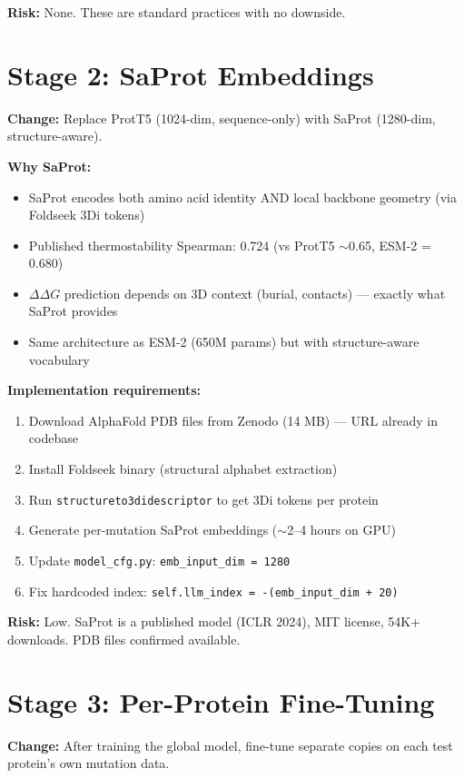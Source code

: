 \textbf{Risk:} None. These are standard practices with no downside.

\section{Stage 2: SaProt Embeddings}

\textbf{Change:} Replace ProtT5 (1024-dim, sequence-only) with SaProt (1280-dim, structure-aware).

\textbf{Why SaProt:}
\begin{itemize}
    \item SaProt encodes both amino acid identity AND local backbone geometry (via Foldseek 3Di tokens)
    \item Published thermostability Spearman: 0.724 (vs ProtT5 $\sim$0.65, ESM-2 = 0.680)
    \item $\Delta\Delta G$ prediction depends on 3D context (burial, contacts) --- exactly what SaProt provides
    \item Same architecture as ESM-2 (650M params) but with structure-aware vocabulary
\end{itemize}

\textbf{Implementation requirements:}
\begin{enumerate}
    \item Download AlphaFold PDB files from Zenodo (14 MB) --- URL already in codebase
    \item Install Foldseek binary (structural alphabet extraction)
    \item Run \texttt{structureto3didescriptor} to get 3Di tokens per protein
    \item Generate per-mutation SaProt embeddings ($\sim$2--4 hours on GPU)
    \item Update \texttt{model\_cfg.py}: \texttt{emb\_input\_dim = 1280}
    \item Fix hardcoded index: \texttt{self.llm\_index = -(emb\_input\_dim + 20)}
\end{enumerate}

\textbf{Risk:} Low. SaProt is a published model (ICLR 2024), MIT license, 54K+ downloads. PDB files confirmed available.

\section{Stage 3: Per-Protein Fine-Tuning}

\textbf{Change:} After training the global model, fine-tune separate copies on each test protein's own mutation data.


